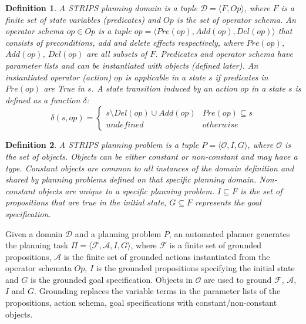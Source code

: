 \documentclass[doctor]{thesis} %
\theoremstyle{plain}
\newtheorem{definition}{Definition}
\begin{document}
\begin{definition}
A STRIPS planning domain is a tuple $\mathcal{D}=\langle F, Op\rangle$, where $F$ is a finite set of  state variables (predicates) and $Op$ is the set of operator schema. An operator schema $op \in Op$ is a tuple $ op = \langle Pre(op), Add(op), Del(op)\rangle$ that consists of preconditions, add and delete effects respectively, where $Pre(op)$, $Add(op)$, $Del(op)$ are all subsets of $F$. Predicates and operator schema have parameter lists and can be instantiated with objects (defined later). An instantiated operator (action) $op$ is applicable in a state $s$ if predicates in $Pre(op)$ are \textit{True} in $s$. A state transition induced by an action $op$ in a state $s$ is defined as a function $\delta$:
\begin{equation*}
\delta (s,op) = \left\{\begin{matrix}
s\setminus Del(op) \cup Add(op) & Pre(op) \subseteq s\\ 
undefined & otherwise
\end{matrix}\right.
\end{equation*}
\end{definition}

\begin{definition}
A STRIPS planning problem is a tuple $P = \langle \mathcal{O}, I, G\rangle$, where $\mathcal{O}$ is the set of objects. Objects can be either constant or non-constant and may have a type. Constant objects are common to all instances of the domain definition and shared by planning problems defined on that specific planning domain. Non-constant objects are unique to a specific planning problem. $I \subseteq F$ is the set of propositions that are true in the initial state, $G\subseteq F$ represents the goal specification.
\end{definition}

Given a domain $\mathcal{D}$ and a planning problem $P$, an automated planner generates the planning task $\Pi=\langle \mathcal{F}, \mathcal{A}, I, G\rangle$, where $\mathcal{F}$ is a finite set of grounded propositions, $\mathcal{A}$ is the finite set of grounded actions instantiated from the operator schemata $Op$, $I$ is the grounded propositions specifying the initial state and $G$ is the grounded goal specification. Objects in $\mathcal{O}$ are used to ground $\mathcal{F}$, $\mathcal{A}$, $I$ and $G$. Grounding replaces the variable terms in the parameter lists of the propositions, action schema, goal specifications with constant/non-constant objects. 
\end{document}
